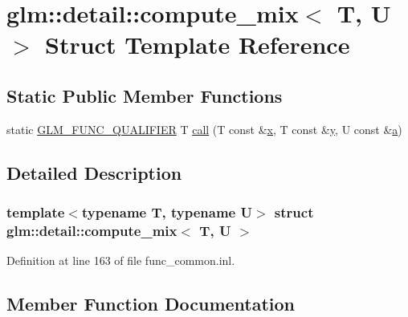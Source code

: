 \hypertarget{structglm_1_1detail_1_1compute__mix}{}\section{glm\+::detail\+::compute\+\_\+mix$<$ T, U $>$ Struct Template Reference}
\label{structglm_1_1detail_1_1compute__mix}
\subsection*{Static Public Member Functions}
\begin{DoxyCompactItemize}
\item 
static \mbox{\hyperlink{setup_8hpp_a33fdea6f91c5f834105f7415e2a64407}{G\+L\+M\+\_\+\+F\+U\+N\+C\+\_\+\+Q\+U\+A\+L\+I\+F\+I\+ER}} T \mbox{\hyperlink{structglm_1_1detail_1_1compute__mix_a13fd963d8385f36486509a48fd68da1c}{call}} (T const \&\mbox{\hyperlink{glad_8h_a92d0386e5c19fb81ea88c9f99644ab1d}{x}}, T const \&\mbox{\hyperlink{glad_8h_a66ddd433d2cacfe27f5906b7e86faeed}{y}}, U const \&\mbox{\hyperlink{glad_8h_ac8729153468b5dcf13f971b21d84d4e5}{a}})
\end{DoxyCompactItemize}


\subsection{Detailed Description}
\subsubsection*{template$<$typename T, typename U$>$\newline
struct glm\+::detail\+::compute\+\_\+mix$<$ T, U $>$}



Definition at line 163 of file func\+\_\+common.\+inl.



\subsection{Member Function Documentation}
\mbox{\label{structglm_1_1detail_1_1compute__mix_a13fd963d8385f36486509a48fd68da1c}} 
